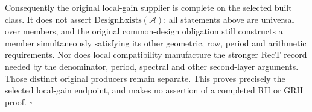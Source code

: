 Consequently the original local-gain supplier is complete on the
selected built class.  It does not assert
\(\mathrm{DesignExists}(\mathcal A)\): all statements above are
universal over members, and the original common-design obligation
still constructs a member simultaneously satisfying its other
geometric, row, period and arithmetic requirements.  Nor does
local compatibility manufacture the stronger \(\mathrm{RecT}\)
record needed by the denominator, period, spectral and other
second-layer arguments.  Those distinct original producers remain
separate.  This proves precisely the selected local-gain endpoint,
and makes no assertion of a completed RH or GRH proof.
\hfill\(\square\)
